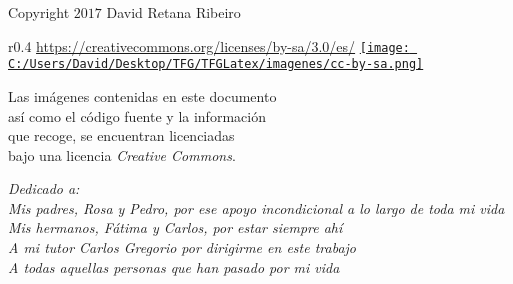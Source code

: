 \documentclass[10pt, a4paper, twoside]{report} %
\begin{document}





\newpage
\thispagestyle{empty} %
\null\vfill


\newpage
\thispagestyle{empty} %
\null\vfill


\textcopyright \hspace{0.3cm} Copyright $2017$ David Retana Ribeiro\\

\begin{wrapfigure}{r}{0.4\textwidth}
  \centering \url{https://creativecommons.org/licenses/by-sa/3.0/es/}
  \href{https://creativecommons.org/licenses/by-sa/3.0/es/}
       {\texttt{[image: C:/Users/David/Desktop/TFG/TFGLatex/imagenes/cc-by-sa.png]}}
\end{wrapfigure}
\noindent Las imágenes contenidas en este documento \\
así como el código fuente y la información \\
que recoge, se encuentran licenciadas \\
bajo una licencia \textit{Creative Commons}.

\clearpage

\thispagestyle{empty}
\begin{flushright}
  \textit{Dedicado a: \\
  Mis padres, Rosa y Pedro, por ese apoyo incondicional a lo largo de toda mi vida \\
  Mis hermanos, Fátima y Carlos, por estar siempre ahí\\
  A mi tutor Carlos Gregorio por dirigirme en este trabajo\\
  A todas aquellas personas que han pasado por mi vida}
\end{flushright}
\end{document}
